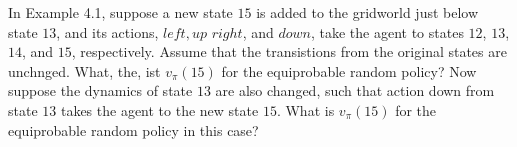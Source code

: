 
\begin{exercise}

In Example 4.1, suppose a new state $15$ is added to the gridworld just below state $13$, and its actions, $\mathit{left}, \mathit{up}$ $\mathit{right}$, and $\mathit{down}$, take the agent to states $12$, $13$, $14$, and $15$, respectively.
Assume that the transistions from the original states are unchnged. 
What, the, ist $v_\pi(15)$ for the equiprobable random policy?
Now suppose the dynamics of state $13$ are also changed, such that action down from state $13$ takes the agent to the new state $15$.
What is $v_\pi(15)$ for the equiprobable random policy in this case?

\end{exercise}


